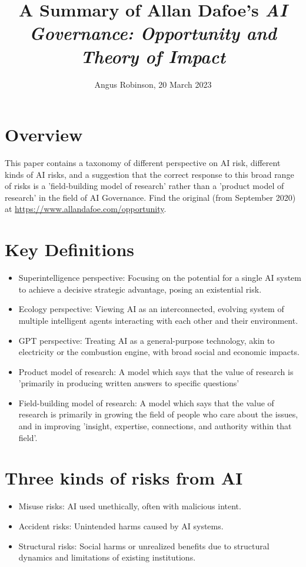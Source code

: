 \documentclass{article}
\title{A Summary of Allan Dafoe's \textit{AI Governance: Opportunity and Theory of Impact}}
\author{Angus Robinson, 20 March 2023}
\date{}
\begin{document}

\maketitle
\begin{multicols}{2}

\section{Overview}
This paper contains a taxonomy of different perspective on AI risk, different kinds of AI risks, and a suggestion that the correct response to this broad range of risks is a 'field-building model of research' rather than a 'product model of research' in the field of AI Governance. Find the original (from September 2020) at \href{https://www.allandafoe.com/opportunity}{https://www.allandafoe.com/opportunity}.

\section{Key Definitions}
\begin{itemize}
    \item Superintelligence perspective: Focusing on the potential for a single AI system to achieve a decisive strategic advantage, posing an existential risk.
    \item Ecology perspective: Viewing AI as an interconnected, evolving system of multiple intelligent agents interacting with each other and their environment.
    \item GPT perspective: Treating AI as a general-purpose technology, akin to electricity or the combustion engine, with broad social and economic impacts.
    \item Product model of research: A model which says that the value of research is 'primarily in producing written answers to specific questions'
    \item Field-building model of research: A model which says that the value of research is primarily in growing the field of people who care about the issues, and in improving 'insight, expertise, connections, and authority within that field'.
\end{itemize}

\section{Three kinds of risks from AI}
\begin{itemize}
    \item Misuse risks: AI used unethically, often with malicious intent.
    \item Accident risks: Unintended harms caused by AI systems.
    \item Structural risks: Social harms or unrealized benefits due to structural dynamics and limitations of existing institutions.
\end{itemize}


\end{multicols}
\end{document}
